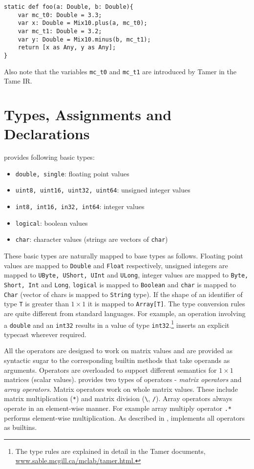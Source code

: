 \begin{lstlisting}[language=X10,numbers=none]
static def foo(a: Double, b: Double){
    var mc_t0: Double = 3.3;
    var x: Double = Mix10.plus(a, mc_t0);
    var mc_t1: Double = 3.2;
    var y: Double = Mix10.minus(b, mc_t1);
    return [x as Any, y as Any];
}
\end{lstlisting}

Also note that the variables \verb|mc_t0| and \verb|mc_t1| are introduced by
Tamer in the Tame IR. 


\section{Types, Assignments and Declarations}

\matlab provides following basic types:
\begin{itemize}
\item \verb|double, single|: floating point values
\item \verb|uint8, uint16, uint32, uint64|: unsigned integer values 
\item \verb|int8, int16, in32, int64|:	integer values
\item \verb|logical|: boolean values
\item \verb|char|: character values (strings are vectors of \verb|char|)
\end{itemize}

These basic types are naturally mapped to \xten base types as follows.  Floating
point values are mapped to \verb|Double| and \verb|Float| respectively, unsigned
integers are mapped to \verb|UByte, UShort, UInt| and \verb|ULong|, integer
values are mapped to \verb|Byte, Short, Int| and \verb|Long|, \verb|logical| is
mapped to \verb|Boolean| and \verb|char| is mapped to \verb|Char| (vector of
chars is mapped to \verb|String| type). If the shape of an identifier of type
\verb|T| is greater than $1\times1$ it is mapped to \verb|Array[T]|.  The type
conversion rules are quite different from standard languages.  For example, an
operation involving a \verb|double| and an \verb|int32| results in a value of
type \verb|int32|.\footnote{The type rules are explained in detail in the Tamer
documents, \url{www.sable.mcgill.ca/mclab/tamer.html.}}  \mixten inserts an
explicit typecast wherever required.
  
All the \matlab operators are designed to work on matrix values and are provided
as syntactic sugar to the corresponding builtin methods that take operands as
arguments.  Operators are overloaded to support different semantics for
$1\times1$ matrices (scalar values). \matlab provides two types of operators -
\emph{matrix operators} and \emph{array operators}. Matrix operators work on
whole matrix values.  These include matrix multiplication (\verb+*+) and matrix
division (\verb+\+, \verb+/+). Array operators always operate in an element-wise
manner. For example array multiply operator \verb+.*+ performs element-wise
multiplication. As described in , \mixten implements all
operators as builtins.

